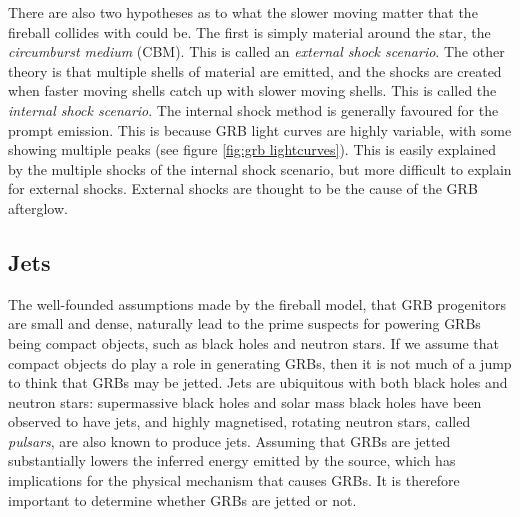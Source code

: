 \documentclass[11pt]{cuthesis}
\begin{document}
There are also two hypotheses as to what the slower moving matter that the fireball collides with could be. The first is simply material around the star, the \textit{circumburst medium} (CBM). This is called an \textit{external shock scenario}. The other theory is that multiple shells of material are emitted, and the shocks are created when faster moving shells catch up with slower moving shells. This is called the \textit{internal shock scenario}. The internal shock method is generally favoured for the prompt emission. This is because GRB light curves are highly variable, with some showing multiple peaks (see figure \ref{fig:grb lightcurves}). This is easily explained by the multiple shocks of the internal shock scenario, but more difficult to explain for external shocks. External shocks are thought to be the cause of the GRB afterglow.



\subsection{Jets} \label{sec:jets}
The well-founded assumptions made by the fireball model, that GRB progenitors are small and dense, naturally lead to the prime suspects for powering GRBs being compact objects, such as black holes and neutron stars. If we assume that compact objects do play a role in generating GRBs, then it is not much of a jump to think that GRBs may be jetted. Jets are ubiquitous with both black holes and neutron stars: supermassive black holes and solar mass black holes have been observed to have jets, and highly magnetised, rotating neutron stars, called \textit{pulsars}, are also known to produce jets. Assuming that GRBs are jetted substantially lowers the inferred energy emitted by the source, which has implications for the physical mechanism that causes GRBs. It is therefore important to determine whether GRBs are jetted or not. 
\end{document}
